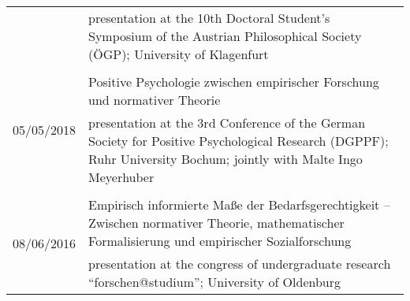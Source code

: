 \documentclass[a4paper,10pt]{article}
\begin{document}
\begin{longtable}{p{}p{11cm}}
& \footnotesize{presentation at the 10th Doctoral Student's Symposium of the Austrian Philosophical Society (ÖGP); University of Klagenfurt}\\
\\
\multirow{2}{2,25cm}{\footnotesize{05/05/2018}} & Positive Psychologie zwischen empirischer Forschung und normativer Theorie\\
& \footnotesize{presentation at the 3rd Conference of the German Society for Positive Psychological Research (DGPPF); Ruhr University Bochum; jointly with Malte Ingo Meyerhuber}\\
\\
\multirow{2}{2,25cm}{\footnotesize{08/06/2016}} & Empirisch informierte Maße der Bedarfsgerechtigkeit -- Zwischen normativer Theorie, mathematischer Formalisierung und empirischer Sozialforschung\\
& \footnotesize{presentation at the congress of undergraduate research \enquote{forschen@studium}; University of Oldenburg}\\
\end{longtable}
\end{document}
